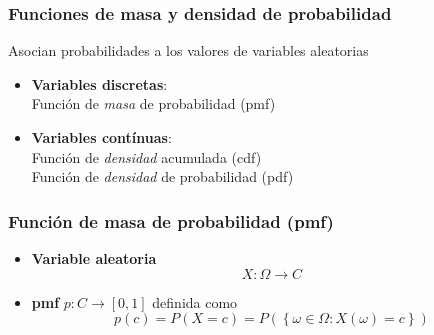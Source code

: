 \documentclass[xcolor=dvipsnames,10pt]{beamer}
\begin{document}
%
\begin{frame}
  \frametitle{Funciones de masa y densidad de probabilidad}
  Asocian probabilidades a los valores de variables aleatorias
  \begin{itemize}
  \item \textbf{Variables discretas}:\\
    Función de \emph{masa} de probabilidad (pmf)
  \item \textbf{Variables contínuas}:\\
    Función de \emph{densidad} acumulada (cdf)\\
    Función de \emph{densidad} de probabilidad (pdf)
  \end{itemize}
\end{frame}
%
\begin{frame}
  \frametitle{Función de masa de probabilidad (pmf)}
  \begin{itemize}
  \item \textbf{Variable aleatoria}
    \begin{equation*}
      X \colon \Omega \to C
    \end{equation*}
  \item \textbf{pmf} $p : C \to [0, 1]$ definida como
    \begin{equation*}
      p(c) = P(X = c) = P \left ( \left \{ \omega \in \Omega \colon X(\omega) = c \right \} \right )
    \end{equation*}
  \end{itemize}
\end{frame}
%
\end{document}
